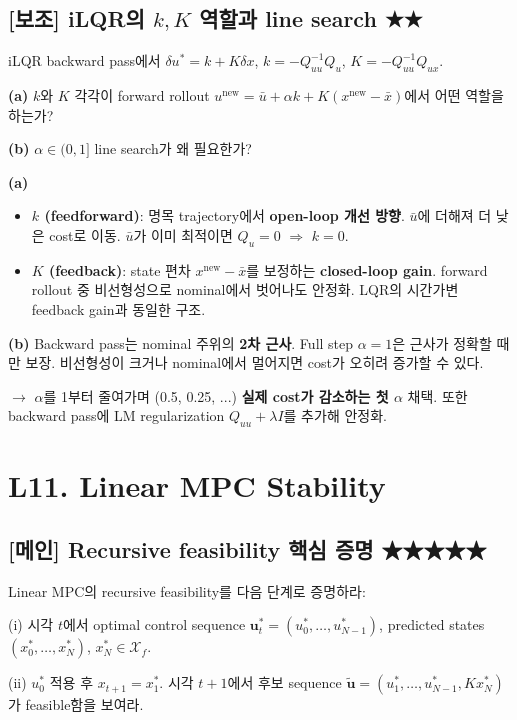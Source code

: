 \documentclass[11pt,a4paper]{article}
\begin{document}
\subsection*{[보조] iLQR의 $k, K$ 역할과 line search \hfill ★★}

\begin{prob}
iLQR backward pass에서 $\delta u^* = k + K\delta x$, $k = -Q_{uu}^{-1}Q_u$, $K = -Q_{uu}^{-1}Q_{ux}$.

\textbf{(a)} $k$와 $K$ 각각이 forward rollout $u^{\text{new}} = \bar u + \alpha k + K(x^{\text{new}} - \bar x)$에서 어떤 역할을 하는가?

\textbf{(b)} $\alpha \in (0, 1]$ line search가 왜 필요한가?
\end{prob}

\begin{sol}
\textbf{(a)}
\begin{itemize}
  \item \textbf{$k$ (feedforward)}: 명목 trajectory에서 \textbf{open-loop 개선 방향}. $\bar u$에 더해져 더 낮은 cost로 이동. $\bar u$가 이미 최적이면 $Q_u = 0$ $\Rightarrow$ $k = 0$.
  \item \textbf{$K$ (feedback)}: state 편차 $x^{\text{new}} - \bar x$를 보정하는 \textbf{closed-loop gain}. forward rollout 중 비선형성으로 nominal에서 벗어나도 안정화. LQR의 시간가변 feedback gain과 동일한 구조.
\end{itemize}

\textbf{(b)} Backward pass는 nominal 주위의 \textbf{2차 근사}. Full step $\alpha = 1$은 근사가 정확할 때만 보장. 비선형성이 크거나 nominal에서 멀어지면 cost가 오히려 증가할 수 있다.

$\to$ $\alpha$를 1부터 줄여가며 (0.5, 0.25, ...) \textbf{실제 cost가 감소하는 첫 $\alpha$} 채택. 또한 backward pass에 LM regularization $Q_{uu} + \lambda I$를 추가해 안정화.
\end{sol}

\section{L11. Linear MPC Stability}

\subsection*{[메인] Recursive feasibility 핵심 증명 \hfill ★★★★★}

\begin{prob}
Linear MPC의 recursive feasibility를 다음 단계로 증명하라:

(i) 시각 $t$에서 optimal control sequence $\mathbf{u}_t^* = (u_0^*, \ldots, u_{N-1}^*)$, predicted states $(x_0^*, \ldots, x_N^*)$, $x_N^* \in \mathcal{X}_f$.

(ii) $u_0^*$ 적용 후 $x_{t+1} = x_1^*$. 시각 $t+1$에서 후보 sequence $\tilde{\mathbf{u}} = (u_1^*, \ldots, u_{N-1}^*, K x_N^*)$가 feasible함을 보여라.
\end{prob}
\end{document}
